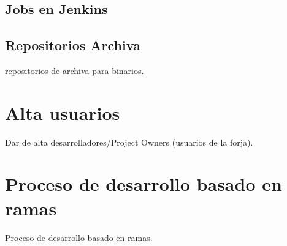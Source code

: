 
\subsection{Jobs en Jenkins}
\label{sub:jobs-jenkins}



\subsection{Repositorios Archiva}
\label{sub:archiva}

\par repositorios de archiva para binarios.


\section{Alta usuarios}
\label{sec:alta-usuarios}

\par Dar de alta desarrolladores/Project Owners (usuarios de la forja).


\section{Proceso de desarrollo basado en ramas}
\label{sec:desarrollo-en-ramas}

\par Proceso de desarrollo basado en ramas.


